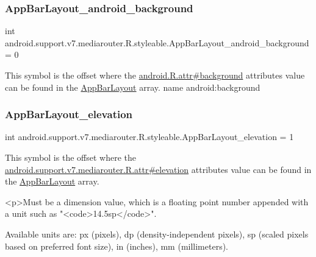 \subsubsection{\texorpdfstring{App\+Bar\+Layout\+\_\+android\+\_\+background}{AppBarLayout\_android\_background}}
{\footnotesize\ttfamily int android.\+support.\+v7.\+mediarouter.\+R.\+styleable.\+App\+Bar\+Layout\+\_\+android\+\_\+background = 0\hspace{0.3cm}{\ttfamily [static]}}

This symbol is the offset where the \hyperlink{}{android.\+R.\+attr\#background} attribute\textquotesingle{}s value can be found in the \hyperlink{classandroid_1_1support_1_1v7_1_1mediarouter_1_1R_1_1styleable_abcffe94741186dacd49a336e4ab2becb}{App\+Bar\+Layout} array.  name android\+:background \mbox{\label{classandroid_1_1support_1_1v7_1_1mediarouter_1_1R_1_1styleable_a94fe1d4c732eab96a6a39f87b5e7033d}} 
\subsubsection{\texorpdfstring{App\+Bar\+Layout\+\_\+elevation}{AppBarLayout\_elevation}}
{\footnotesize\ttfamily int android.\+support.\+v7.\+mediarouter.\+R.\+styleable.\+App\+Bar\+Layout\+\_\+elevation = 1\hspace{0.3cm}{\ttfamily [static]}}

This symbol is the offset where the \hyperlink{classandroid_1_1support_1_1v7_1_1mediarouter_1_1R_1_1attr_ab1ec64066729d67ab6ae697dc2178d06}{android.\+support.\+v7.\+mediarouter.\+R.\+attr\#elevation} attribute\textquotesingle{}s value can be found in the \hyperlink{classandroid_1_1support_1_1v7_1_1mediarouter_1_1R_1_1styleable_abcffe94741186dacd49a336e4ab2becb}{App\+Bar\+Layout} array.

\begin{DoxyVerb}      <p>Must be a dimension value, which is a floating point number appended with a unit such as "<code>14.5sp</code>".
\end{DoxyVerb}
 Available units are\+: px (pixels), dp (density-\/independent pixels), sp (scaled pixels based on preferred font size), in (inches), mm (millimeters). 

